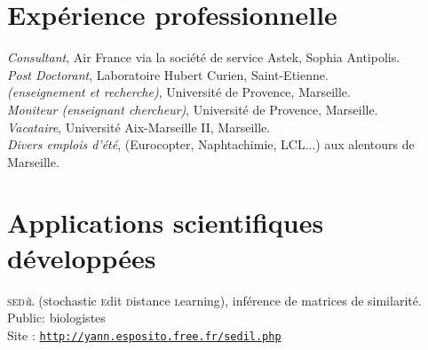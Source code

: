 


\reversemarginpar



\afficheContactInfos

\section*{Expérience professionnelle}

\noindent{}\emph{Consultant}, Air France via la société de service Astek, Sophia Antipolis.\\
\emph{Post Doctorant}, Laboratoire Hubert Curien, Saint-Etienne.\\
\emph{ {\footnotesize (enseignement et recherche)}}, Université de Provence, Marseille.\\
\emph{Moniteur (enseignant \amper{} chercheur)}, Université de Provence, Marseille.\\
\emph{Vacataire}, Université Aix-Marseille II, Marseille.\\
\emph{Divers emplois d'été}, {\footnotesize (Eurocopter, Naphtachimie, LCL...) } aux alentours de Marseille.\\

\section*{Applications scientifiques développées}
\textsc{sed}\textit{\footnotesize i}\textsc{l} ({\textsc{\color{darkred}s}tochastic 
\textsc{\color{darkred}e}dit
\textsc{\color{darkred}d}{\color{darkred}i}stance
\textsc{\color{darkred}l}earning}), 
inférence de matrices de similarité.\\
{\footnotesize \phantom{espace}Public: biologistes}\\
{\footnotesize \phantom{espace}Site : \href{http://yann.esposito.free.fr/sedil.php}{\texttt{http\string://yann.esposito.free.fr/sedil.php}}}

